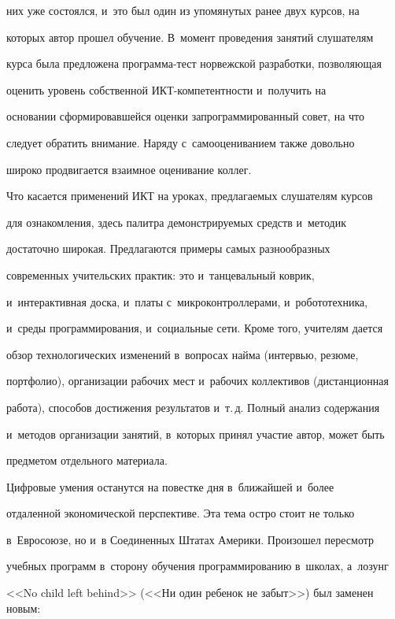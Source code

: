 них уже состоялся, и~это был один из упомянутых ранее двух курсов, на 


которых автор прошел обучение. В~момент проведения занятий слушателям 


курса была предложена про\-грамма-тест норвежской разработки, позволяющая 


оценить уровень собственной ИКТ-ком\-пе\-тент\-ности и~получить на 


основании сформировавшейся оценки запрограммированный совет, на что 


следует обратить внимание. Наряду с~самооцениванием также довольно 


широко продвигается взаимное оценивание коллег. 


  


  Что касается применений ИКТ на уроках, предлагаемых слушателям курсов 


для ознакомления, здесь палитра демонстрируемых средств и~методик 


достаточно широкая. Предлагаются примеры самых разнообразных 


современных учительских практик: это и~танцевальный коврик, 


и~интерактивная доска, и~платы с~микроконтроллерами, и~робототехника, 


и~среды программирования, и~социальные сети. Кроме того, учителям дается 


обзор технологических изменений в~вопросах найма (интервью, резюме, 


портфолио), организации рабочих мест и~рабочих коллективов (дистанционная 


работа), способов достижения результатов и~т.\,д. Полный анализ содержания 


и~методов организации занятий, в~которых принял участие автор, может быть 


предметом отдельного материала.


  


    Цифровые умения останутся на повестке дня в~ближайшей и~более 


отдаленной экономической перспективе. Эта тема остро стоит не только 


в~Евросоюзе, но и~в Соединенных Штатах Америки. Произошел пересмотр 


учебных программ в~сторону обучения программированию в~школах, а~лозунг 


<<No child left behind>> (<<Ни один ребенок не забыт>>) был заменен новым: 


